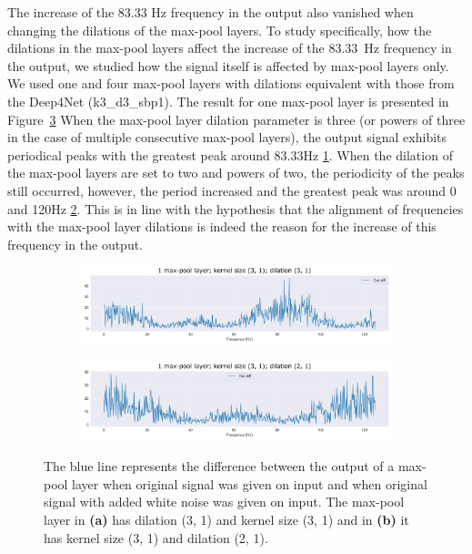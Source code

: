 The increase of the 83.33 Hz frequency in the output also vanished when changing the dilations of the max-pool layers.
To study specifically, how the dilations in the max-pool layers affect the increase of the 83.33~Hz frequency in the output, we studied how the signal itself is affected by max-pool layers only.
We used one and four max-pool layers with dilations equivalent with those from the Deep4Net (k3\_d3\_sbp1).
The result for one max-pool layer is presented in Figure~\ref{fig:max-pool-changes}
When the max-pool layer dilation parameter is three (or powers of three in the case of multiple consecutive max-pool layers), the output signal exhibits periodical peaks with the greatest peak around 83.33Hz \ref{fig:maxpool-k3-d3}.
When the dilation of the max-pool layers are set to two and powers of two, the periodicity of the peaks still occurred, however, the period increased and the greatest peak was around 0 and 120Hz \ref{fig:maxpool-k3-d2}.
This is in line with the hypothesis that the alignment of frequencies with the max-pool layer dilations is indeed the reason for the increase of this frequency in the output. \\


\begin{figure}
\centering
\begin{subfigure}[b]{\textwidth}
   \includegraphics[width=1\linewidth]{img/ch4/absVel-maxpool-k3-d3}
   \caption{}
   \label{fig:maxpool-k3-d3} 
\end{subfigure}

\begin{subfigure}[b]{\textwidth}
   \includegraphics[width=1\linewidth]{img/ch4/absVel-maxpool-k3-d2}
   \caption{}
   \label{fig:maxpool-k3-d2}
\end{subfigure}

\caption[]{The blue line represents the difference between the output of a max-pool layer when original signal was given on input and when original signal with added white noise was given on input. The max-pool layer in \textbf{(a)} has dilation (3, 1) and kernel size (3, 1) and in \textbf{(b)} it has kernel size (3, 1) and dilation (2, 1).} 
\label{fig:max-pool-changes}
\end{figure}

